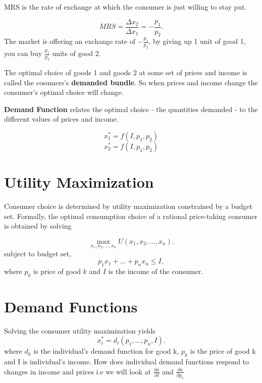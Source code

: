 \documentclass{tufte-handout}
\begin{document}
MRS is the rate of exchange at which the consumer is just willing to stay put.

 \[
MRS = \frac{\Delta x_2}{\Delta x_1} =  -\frac{p_1}{p_2}
.\] 
The market is offering an exchange rate of $-\frac{p_1}{p_2}$, by giving up 1 unit of good 1, you can buy $\frac{p_1}{p_2}$ units of good 2.

The optimal choice of goods 1 and goods 2 at some set of prices and income is called the cosumers's \textbf{demanded bundle}. So when prices and income change the consumer's optimal choice will change.



\textbf{Demand Function} relates the optimal choice - the quantities demanded - to the different values of prices and income.

\[
x_1^* = f(I, p_1, p_2)\] $$  x_2^* = f(I, p_1, p_2)$$


\section*{\textbf{Utility Maximization}}


Consumer choice is determined by utility maximization constrained by a budget set. Formally, the optimal consumption choice of a rational price-taking consumer is obtained by solving


\[
		\max_{x_1, x_2, ..., x_n} U(x_1, x_2,...,x_n)
.\] 
subject to budget set,
\[
p_1x_1 + ... + p_nx_n \le I
,\] 
where $p_k$ is price of good $k$ and  $I$ is the income of the consumer. \\ 



\section*{\textbf{Demand Functions}}

Solving the consumer utility maximization yields
\[
x_i^* = d_i(p_1,...,p_n, I)
.\] 
where $d_k$ is the individual's demand function for good k,  $p_k$ is the price of good k and I is individual's income.
How does individual demand functions respond to changes in income and prices i.e we will look at $\frac{\partial  x }{\partial I }$ and $\frac{\partial x }{\partial  p_x }$



\vspace{1cm}
\end{document}
